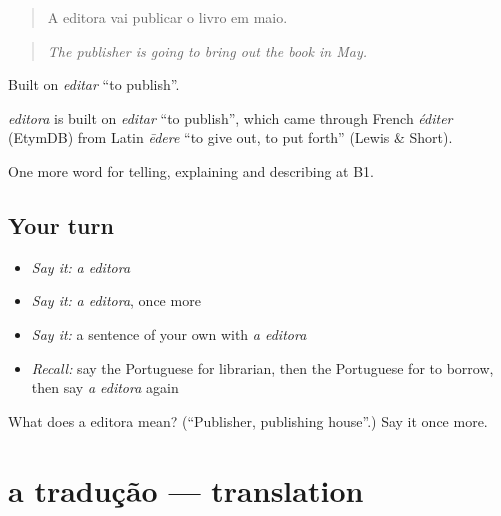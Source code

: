 \begin{quote}
A editora vai publicar o livro em maio.
\end{quote}

\begin{quote}
\emph{The publisher is going to bring out the book in May.}
\end{quote}

Built on \emph{editar} \textquotedblleft{}to publish\textquotedblright{}.

\begin{cousinweb}
\emph{editora} is built on \emph{editar} \textquotedblleft{}to publish\textquotedblright{}, which came through French \emph{éditer} (EtymDB) from Latin \emph{ēdere} \textquotedblleft{}to give out, to put forth\textquotedblright{} (Lewis \& Short).
\end{cousinweb}

\begin{grammarlens}[title={What you've built}]
One more word for telling, explaining and describing at B1.
\end{grammarlens}

\subsection*{Your turn}
\begin{itemize}
\raggedright
  \item \emph{Say it:} \emph{a editora}
  \item \emph{Say it:} \emph{a editora}, once more
  \item \emph{Say it:} a sentence of your own with \emph{a editora}
  \item \emph{Recall:} say the Portuguese for librarian, then the Portuguese for to borrow, then say \emph{a editora} again
\end{itemize}

\begin{tcolorbox}[breakable,colback=teal!4,colframe=teal!35!black,title={Before you move on}]
What does a editora mean? (\textquotedblleft{}Publisher, publishing house\textquotedblright{}.) Say it once more.
\end{tcolorbox}
\section[a tradução]{a tradução — translation}

\label{lesson:PT-C525-traducao}




